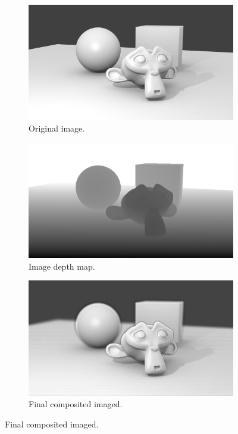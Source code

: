 \documentclass[12pt]{article}
\begin{document}
\pagebreak
\begin{figure}[h!]
  \centering
  \begin{subfigure}[b]{0.4\linewidth}
    \includegraphics[width=\linewidth]{img_rend.png}
    \caption{Original image.}
  \end{subfigure}
  \begin{subfigure}[b]{0.4\linewidth}
    \includegraphics[width=\linewidth]{img_depth.png}
    \caption{Image depth map.}
  \end{subfigure}
  \begin{subfigure}[b]{0.55\linewidth}
    \includegraphics[width=\linewidth]{render.png}
    \caption{Final composited imaged.}
  \end{subfigure}
  

\end{figure}
\end{document}
